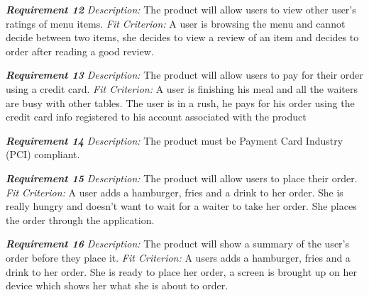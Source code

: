 \documentclass[12pt, titlepage]{article}
\begin{document}
\textbf{\textit{Requirement 12}}\newline
\textit{Description:}\newline
The product will allow users to view other user's ratings of menu items. \newline\newline
\textit{Fit Criterion:}\newline 
A user is browsing the menu and cannot decide between two items, she decides to view a review of an item and decides to order after reading a good review.
\newline

\textbf{\textit{Requirement 13}}\newline
\textit{Description:}\newline
The product will allow users to pay for their order using a credit card. \newline\newline
\textit{Fit Criterion:}\newline 
A user is finishing his meal and all the waiters are busy with other tables. The user is in a rush, he pays for his order using the credit card info registered to his account associated with the product
\newline

\textbf{\textit{Requirement 14}}\newline
\textit{Description:}\newline
The product must be Payment Card Industry (PCI) compliant.
\newline

\textbf{\textit{Requirement 15}}\newline
\textit{Description:}\newline
The product will allow users to place their order. \newline\newline
\textit{Fit Criterion:}\newline 
A user adds a hamburger, fries and a drink to her order. She is really hungry and doesn't want to wait for a waiter to take her order. She places the order through the application.
\newline

\textbf{\textit{Requirement 16}}\newline
\textit{Description:}\newline
The product will show a summary of the user's order before they place it. \newline\newline
\textit{Fit Criterion:}\newline 
A users adds a hamburger, fries and a drink to her order. She is ready to place her order, a screen is brought up on her device which shows her what she is about to order.
\newline
\end{document}

